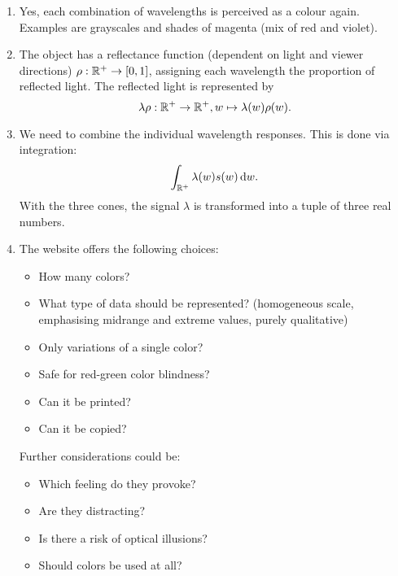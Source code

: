 \documentclass[english]{exercise}
\begin{document}
	\begin{enumerate}
		\item Yes, each combination of wavelengths is perceived as a colour again.
		Examples are grayscales and shades of magenta (mix of red and violet).
		\item The object has a reflectance function (dependent on light and viewer directions) \(\rho: \R^+ \to \brackets*{0, 1}\), assigning each wavelength the proportion of reflected light.
		The reflected light is represented by
		\[
			\lambda\rho: \R^+ \to \R^+, w \mapsto \lambda\parentheses*{w}\rho\parentheses*{w}.
		\]
		\item We need to combine the individual wavelength responses.
		This is done via integration:
		\[
			\int_{\R^+}\lambda\parentheses*{w}s\parentheses*{w}\d w.
		\]
		With the three cones, the signal \(\lambda\) is transformed into a tuple of three real numbers.
		\item The website offers the following choices:
		\begin{itemize}
			\item How many colors?
			\item What type of data should be represented? (homogeneous scale, emphasising midrange and extreme values, purely qualitative)
			\item Only variations of a single color?
			\item Safe for red-green color blindness?
			\item Can it be printed?
			\item Can it be copied?
		\end{itemize}
		Further considerations could be:
		\begin{itemize}
			\item Which feeling do they provoke?
			\item Are they distracting?
			\item Is there a risk of optical illusions?
			\item Should colors be used at all?
		\end{itemize}
	\end{enumerate}
\end{document}

